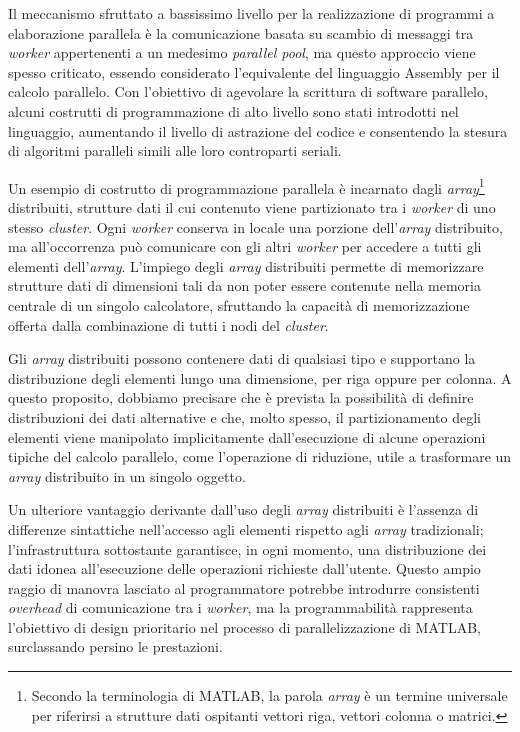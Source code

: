 Il meccanismo sfruttato a bassissimo livello per la realizzazione di programmi a elaborazione parallela \`e la comunicazione basata su scambio di messaggi tra \textit{worker}
appertenenti a un medesimo \textit{parallel pool}, ma questo approccio viene spesso criticato, essendo considerato l'equivalente del linguaggio
Assembly per il calcolo parallelo.\newline
Con l'obiettivo di agevolare la scrittura di software parallelo, alcuni costrutti di programmazione di alto livello sono stati introdotti nel linguaggio, aumentando il livello di
astrazione del codice e consentendo la stesura di algoritmi paralleli simili alle loro controparti seriali.

Un esempio di costrutto di programmazione parallela \`e incarnato dagli \textit{array}\footnote{Secondo la terminologia di MATLAB, la parola \textit{array} \`e un termine universale per riferirsi a strutture dati ospitanti vettori riga, vettori colonna o matrici.}
distribuiti, strutture dati il cui contenuto viene partizionato tra i \textit{worker} di uno stesso \textit{cluster}. Ogni \textit{worker} conserva in locale una porzione dell'\textit{array} distribuito, ma all'occorrenza pu\`o comunicare con gli altri \textit{worker} per accedere a tutti gli elementi dell'\textit{array}.\newline
L'impiego degli \textit{array} distribuiti permette di memorizzare strutture dati di dimensioni tali da non poter essere contenute nella memoria centrale di un
singolo calcolatore, sfruttando la capacit\`a di memorizzazione offerta dalla combinazione di tutti i nodi del \textit{cluster}.

Gli \textit{array} distribuiti possono contenere dati di qualsiasi tipo e supportano la distribuzione degli elementi lungo una dimensione,
per riga oppure per colonna.\newline
A questo proposito, dobbiamo precisare che \`e prevista la possibilit\`a di definire distribuzioni dei dati alternative e che, molto spesso, il partizionamento degli elementi viene manipolato implicitamente dall'esecuzione di alcune operazioni tipiche del calcolo parallelo,
come l'operazione di riduzione, utile a trasformare un \textit{array} distribuito in un singolo oggetto.

Un ulteriore vantaggio derivante dall'uso degli \textit{array} distribuiti \`e l'assenza di differenze sintattiche nell'accesso agli elementi rispetto agli \textit{array} tradizionali; l'infrastruttura sottostante garantisce, in ogni momento, una distribuzione dei dati idonea all'esecuzione delle operazioni
richieste dall'utente.\newline
Questo ampio raggio di manovra lasciato al programmatore potrebbe introdurre consistenti \textit{overhead} di comunicazione tra i \textit{worker},
ma la programmabilit\`a rappresenta l'obiettivo di design prioritario nel processo di parallelizzazione di MATLAB, surclassando persino le prestazioni.

